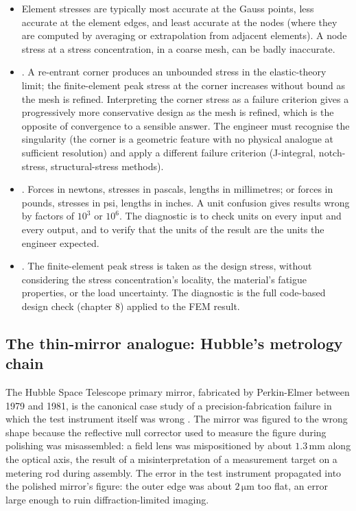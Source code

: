 \begin{itemize}[leftmargin=*]
  \item {} Element stresses are typically most accurate at
    the Gauss points, less accurate at the element edges, and
    least accurate at the nodes (where they are computed by
    averaging or extrapolation from adjacent elements). A node
    stress at a stress concentration, in a coarse mesh, can be
    badly inaccurate.
  \item {}. A
    re-entrant corner produces an unbounded stress in the
    elastic-theory limit; the finite-element peak stress at the
    corner increases without bound as the mesh is refined.
    Interpreting the corner stress as a failure criterion gives a
    progressively more conservative design as the mesh is refined,
    which is the opposite of convergence to a sensible answer. The
    engineer must recognise the singularity (the corner is a
    geometric feature with no physical analogue at sufficient
    resolution) and apply a different failure criterion (J-integral,
    notch-stress, structural-stress methods).
  \item {}. Forces in newtons, stresses in
    pascals, lengths in millimetres; or forces in pounds, stresses
    in psi, lengths in inches. A unit confusion gives results
    wrong by factors of $10^3$ or $10^6$. The diagnostic is to
    check units on every input and every output, and to verify
    that the units of the result are the units the engineer
    expected.
  \item {}. The finite-element peak
    stress is taken as the design stress, without considering the
    stress concentration's locality, the material's fatigue
    properties, or the load uncertainty. The diagnostic is the
    full code-based design check (chapter 8) applied to the FEM
    result.
\end{itemize}

\subsection{The thin-mirror analogue: Hubble's metrology chain}

The Hubble Space Telescope primary mirror, fabricated by
Perkin-Elmer between 1979 and 1981, is the canonical case study
of a precision-fabrication failure in which the test instrument
itself was wrong \cite{acc:nasa-hubble-optical-systems-1990}.
The mirror was figured to the wrong shape because the reflective
null corrector used to measure the figure during polishing was
misassembled: a field lens was mispositioned by about $1.3\,
\si{\milli\meter}$ along the optical axis, the result of a
misinterpretation of a measurement target on a metering rod
during assembly. The error in the test instrument propagated into
the polished mirror's figure: the outer edge was about $2\,\si{
\micro\meter}$ too flat, an error large enough to ruin
diffraction-limited imaging.

